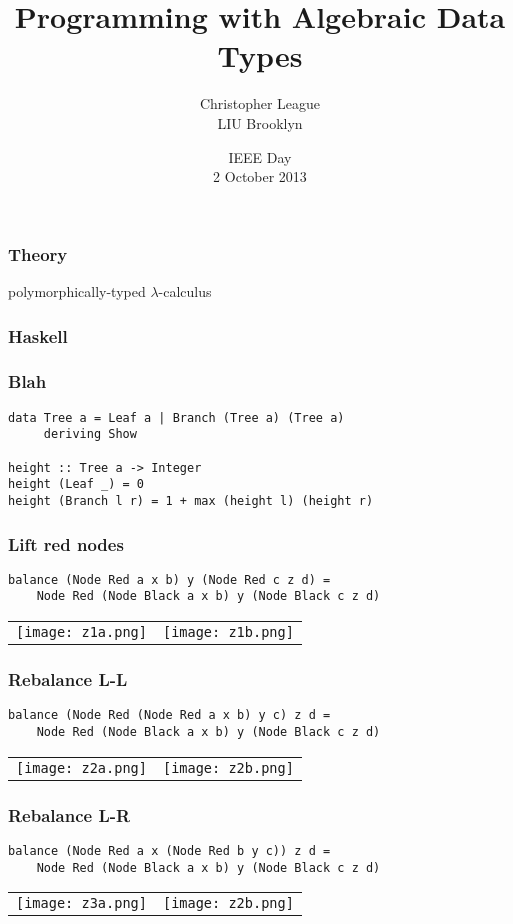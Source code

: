 \documentclass[14pt,t,usepdftitle=false,
xcolornames=x11names,svgnames,dvipsnames]{beamer}
\newcommand{\wackyFont}[1]{
  {\LARGE\fontspec[Mapping=tex-text]{Immi Five O Five Std} #1}}
\newcommand{\subtitleFont}[1]{{\footnotesize #1}}
\begin{document}
\title{\wackyFont{Programming with Algebraic Data Types}}
\author{Christopher League\\\subtitleFont{LIU Brooklyn}}
\date{\subtitleFont{IEEE Day\\2 October 2013}}
\maketitle

\begin{frame}
  \frametitle{Theory}
  polymorphically-typed $\lambda$-calculus
\end{frame}

\begin{frame}
  \frametitle{Haskell}
\end{frame}

\begin{frame}[fragile]
  \frametitle{Blah}
\begin{lstlisting}
data Tree a = Leaf a | Branch (Tree a) (Tree a)
     deriving Show

height :: Tree a -> Integer
height (Leaf _) = 0
height (Branch l r) = 1 + max (height l) (height r)
\end{lstlisting}
\end{frame}

\begin{frame}[fragile]
  \frametitle{Lift red nodes}
\begin{lstlisting}
balance (Node Red a x b) y (Node Red c z d) =
    Node Red (Node Black a x b) y (Node Black c z d)
\end{lstlisting}
  \begin{tabular}{cc}
  \texttt{[image: z1a.png]}
  &
  \texttt{[image: z1b.png]}
  \end{tabular}
\end{frame}

\begin{frame}[fragile]
  \frametitle{Rebalance L-L}
\begin{lstlisting}
balance (Node Red (Node Red a x b) y c) z d =
    Node Red (Node Black a x b) y (Node Black c z d)
\end{lstlisting}
  \begin{tabular}{cc}
  \texttt{[image: z2a.png]}
  &
  \texttt{[image: z2b.png]}
  \end{tabular}
\end{frame}

\begin{frame}[fragile]
  \frametitle{Rebalance L-R}
\begin{lstlisting}
balance (Node Red a x (Node Red b y c)) z d =
    Node Red (Node Black a x b) y (Node Black c z d)
\end{lstlisting}
  \begin{tabular}{cc}
  \texttt{[image: z3a.png]}
  &
  \texttt{[image: z2b.png]}
  \end{tabular}
\end{frame}
\end{document}
